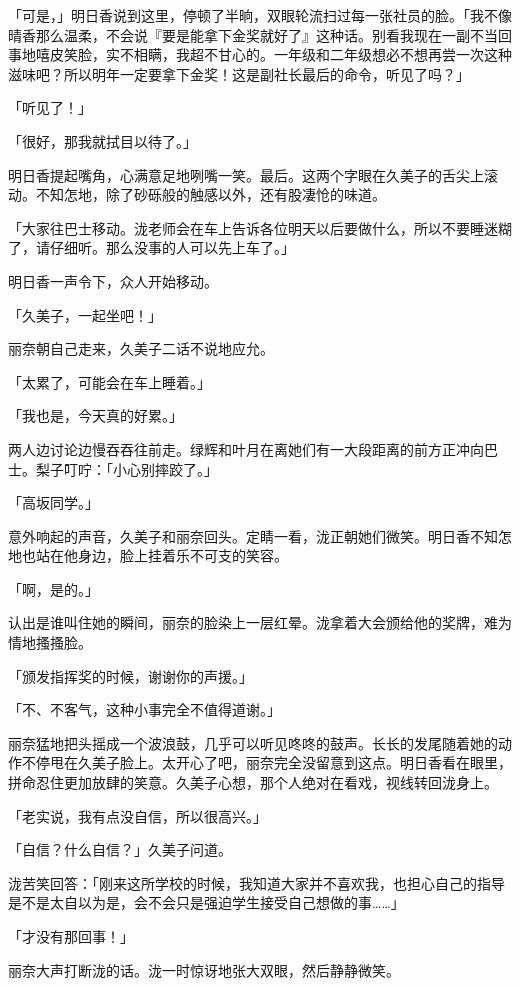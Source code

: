 \documentclass[UTF8]{ctexart}
\begin{document}
    「可是，」明日香说到这里，停顿了半晌，双眼轮流扫过每一张社员的脸。「我不像晴香那么温柔，不会说『要是能拿下金奖就好了』这种话。别看我现在一副不当回事地嘻皮笑脸，实不相瞒，我超不甘心的。一年级和二年级想必不想再尝一次这种滋味吧？所以明年一定要拿下金奖！这是副社长最后的命令，听见了吗？」 

    「听见了！」 

    「很好，那我就拭目以待了。」 

    明日香提起嘴角，心满意足地咧嘴一笑。最后。这两个字眼在久美子的舌尖上滚动。不知怎地，除了砂砾般的触感以外，还有股凄怆的味道。 

    「大家往巴士移动。泷老师会在车上告诉各位明天以后要做什么，所以不要睡迷糊了，请仔细听。那么没事的人可以先上车了。」 

    明日香一声令下，众人开始移动。 

    「久美子，一起坐吧！」 

    丽奈朝自己走来，久美子二话不说地应允。 

    「太累了，可能会在车上睡着。」 

    「我也是，今天真的好累。」 

    两人边讨论边慢吞吞往前走。绿辉和叶月在离她们有一大段距离的前方正冲向巴士。梨子叮咛：「小心别摔跤了。」 

    「高坂同学。」 

    意外响起的声音，久美子和丽奈回头。定睛一看，泷正朝她们微笑。明日香不知怎地也站在他身边，脸上挂着乐不可支的笑容。 

    「啊，是的。」 

    认出是谁叫住她的瞬间，丽奈的脸染上一层红晕。泷拿着大会颁给他的奖牌，难为情地搔搔脸。 

    「颁发指挥奖的时候，谢谢你的声援。」 

    「不、不客气，这种小事完全不值得道谢。」 

    丽奈猛地把头摇成一个波浪鼓，几乎可以听见咚咚的鼓声。长长的发尾随着她的动作不停甩在久美子脸上。太开心了吧，丽奈完全没留意到这点。明日香看在眼里，拼命忍住更加放肆的笑意。久美子心想，那个人绝对在看戏，视线转回泷身上。 

    「老实说，我有点没自信，所以很高兴。」 

    「自信？什么自信？」久美子问道。 

    泷苦笑回答：「刚来这所学校的时候，我知道大家并不喜欢我，也担心自己的指导是不是太自以为是，会不会只是强迫学生接受自己想做的事……」 

    「才没有那回事！」 

    丽奈大声打断泷的话。泷一时惊讶地张大双眼，然后静静微笑。 
\end{document}
